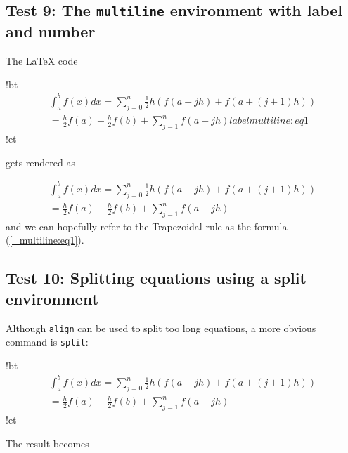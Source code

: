\documentclass[%
oneside,                 %
final,                   %
10pt]{article}
\begin{document}
\subsection{Test 9: The \texttt{multiline} environment with label and number}

The {\LaTeX} code










\blatexcod
!bt
\begin{multline}
\int_a^b f(x)dx = \sum_{j=0}^{n} \frac{1}{2} h(f(a+jh) +
f(a+(j+1)h)) \\ 
=\frac{h}{2}f(a) + \frac{h}{2}f(b) + \sum_{j=1}^n f(a+jh)
label{multiline:eq1}
\end{multline}
!et

\elatexcod

gets rendered as

\begin{multline}
\int_a^b f(x)dx = \sum_{j=0}^{n} \frac{1}{2} h(f(a+jh) +
f(a+(j+1)h)) \\ 
=\frac{h}{2}f(a) + \frac{h}{2}f(b) + \sum_{j=1}^n f(a+jh)
\label{_multiline:eq1}
\end{multline}
and we can hopefully refer to the Trapezoidal rule
as the formula (\ref{_multiline:eq1}).

\subsection{Test 10: Splitting equations using a split environment}

Although \texttt{align} can be used to split too long equations, a more obvious
command is \texttt{split}:











\blatexcod
!bt
\begin{equation}
\begin{split}
\int_a^b f(x)dx = \sum_{j=0}^{n} \frac{1}{2} h(f(a+jh) +
f(a+(j+1)h)) \\ 
=\frac{h}{2}f(a) + \frac{h}{2}f(b) + \sum_{j=1}^n f(a+jh)
\end{split}
\end{equation}
!et

\elatexcod


The result becomes
\end{document}
